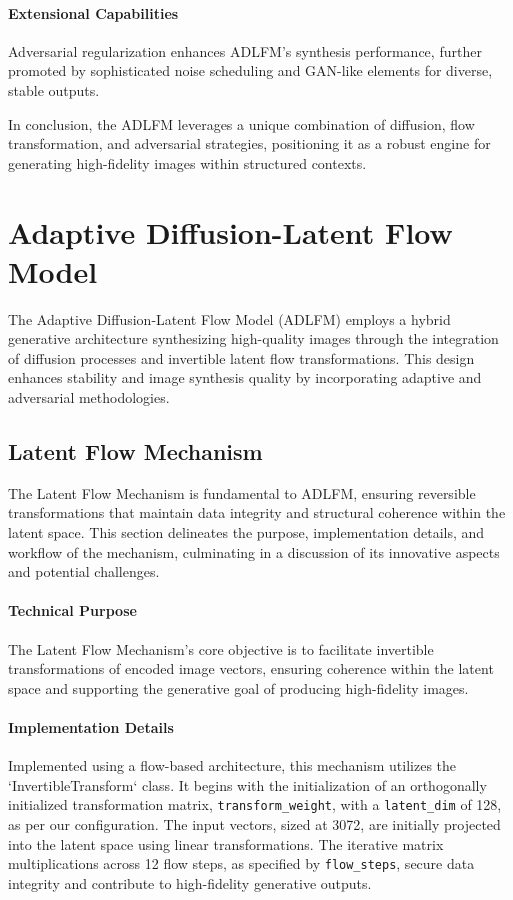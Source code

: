 \documentclass{article} %
\begin{document}
\paragraph{Extensional Capabilities}

Adversarial regularization enhances ADLFM's synthesis performance, further promoted by sophisticated noise scheduling and GAN-like elements \citep{goodfellow2014generative} for diverse, stable outputs.

In conclusion, the ADLFM leverages a unique combination of diffusion, flow transformation, and adversarial strategies, positioning it as a robust engine for generating high-fidelity images within structured contexts.



\section{Adaptive Diffusion-Latent Flow Model}

The Adaptive Diffusion-Latent Flow Model (ADLFM) employs a hybrid generative architecture synthesizing high-quality images through the integration of diffusion processes and invertible latent flow transformations. This design enhances stability and image synthesis quality by incorporating adaptive and adversarial methodologies.

\subsection{Latent Flow Mechanism}

The Latent Flow Mechanism is fundamental to ADLFM, ensuring reversible transformations that maintain data integrity and structural coherence within the latent space. This section delineates the purpose, implementation details, and workflow of the mechanism, culminating in a discussion of its innovative aspects and potential challenges.

\paragraph{Technical Purpose}
The Latent Flow Mechanism's core objective is to facilitate invertible transformations of encoded image vectors, ensuring coherence within the latent space and supporting the generative goal of producing high-fidelity images.

\paragraph{Implementation Details}
Implemented using a flow-based architecture, this mechanism utilizes the `InvertibleTransform` class. It begins with the initialization of an orthogonally initialized transformation matrix, \texttt{transform\_weight}, with a \texttt{latent\_dim} of 128, as per our configuration. The input vectors, sized at 3072, are initially projected into the latent space using linear transformations. The iterative matrix multiplications across 12 flow steps, as specified by \texttt{flow\_steps}, secure data integrity and contribute to high-fidelity generative outputs.
\end{document}
